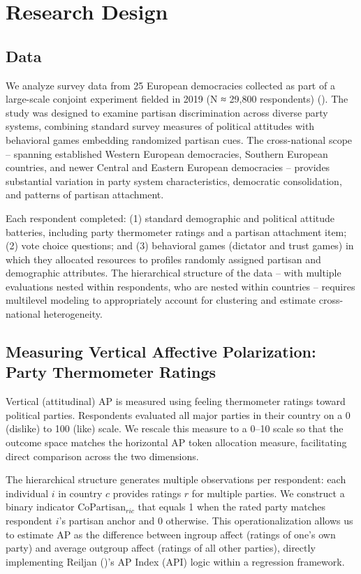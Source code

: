 \documentclass[
  12pt,
  a4paper,
  DIV=11,
  numbers=noendperiod]{scrartcl}
\begin{document}
\section{Research Design}\label{sec-rd}

\subsection{Data}\label{sec-data}

We analyze survey data from 25 European democracies collected as part of
a large-scale conjoint experiment fielded in 2019 (N ≈ 29,800
respondents) (). The study was designed to examine partisan discrimination across
diverse party systems, combining standard survey measures of political
attitudes with behavioral games embedding randomized partisan cues. The
cross-national scope -- spanning established Western European
democracies, Southern European countries, and newer Central and Eastern
European democracies -- provides substantial variation in party system
characteristics, democratic consolidation, and patterns of partisan
attachment.

Each respondent completed: (1) standard demographic and political
attitude batteries, including party thermometer ratings and a partisan
attachment item; (2) vote choice questions; and (3) behavioral games
(dictator and trust games) in which they allocated resources to profiles
randomly assigned partisan and demographic attributes. The hierarchical
structure of the data -- with multiple evaluations nested within
respondents, who are nested within countries -- requires multilevel
modeling to appropriately account for clustering and estimate
cross-national heterogeneity.

\subsection{Measuring Vertical Affective Polarization: Party Thermometer
Ratings}\label{sec-vertical-measure}

Vertical (attitudinal) AP is measured using feeling thermometer ratings
toward political parties. Respondents evaluated all major parties in
their country on a 0 (dislike) to 100 (like) scale. We rescale this
measure to a 0--10 scale so that the outcome space matches the
horizontal AP token allocation measure, facilitating direct comparison
across the two dimensions.

The hierarchical structure generates multiple observations per
respondent: each individual \(i\) in country \(c\) provides ratings
\(r\) for multiple parties. We construct a binary indicator
\(\text{CoPartisan}_{ric}\) that equals 1 when the rated party matches
respondent \(i\)'s partisan anchor and 0 otherwise. This
operationalization allows us to estimate AP as the difference between
ingroup affect (ratings of one's own party) and average outgroup affect
(ratings of all other parties), directly implementing Reiljan
()'s AP Index (API) logic within a
regression framework.
\end{document}
